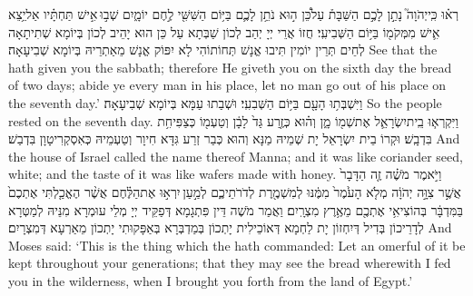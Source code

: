 {רְא֗וּ כִּֽי\maqqaf יְהֹוָה֮ נָתַ֣ן לָכֶ֣ם הַשַּׁבָּת֒ עַל\maqqaf כֵּ֠ן ה֣וּא נֹתֵ֥ן לָכֶ֛ם בַּיּ֥וֹם הַשִּׁשִּׁ֖י לֶ֣חֶם יוֹמָ֑יִם שְׁב֣וּ \legarmeh  אִ֣ישׁ תַּחְתָּ֗יו אַל\maqqaf יֵ֥צֵא אִ֛ישׁ מִמְּקֹמ֖וֹ בַּיּ֥וֹם הַשְּׁבִיעִֽי׃}
{חֲזוֹ אֲרֵי יְיָ יְהַב לְכוֹן שַׁבְּתָא עַל כֵּן הוּא יָהֵיב לְכוֹן בְּיוֹמָא שְׁתִיתָאָה לְחֵים תְּרֵין יוֹמִין תִּיבוּ אֱנָשׁ תְּחוֹתוֹהִי לָא יִפּוֹק אֱנָשׁ מֵאַתְרֵיהּ בְּיוֹמָא שְׁבִיעָאָה׃}
{See that the \lord\space hath given you the sabbath; therefore He giveth you on the sixth day the bread of two days; abide ye every man in his place, let no man go out of his place on the seventh day.’}{}
{וַיִּשְׁבְּת֥וּ הָעָ֖ם בַּיּ֥וֹם הַשְּׁבִעִֽי׃}
{וּשְׁבַתוּ עַמָּא בְּיוֹמָא שְׁבִיעָאָה׃}
{So the people rested on the seventh day.}{}
{וַיִּקְרְא֧וּ בֵֽית\maqqaf יִשְׂרָאֵ֛ל אֶת\maqqaf שְׁמ֖וֹ מָ֑ן וְה֗וּא כְּזֶ֤רַע גַּד֙ לָבָ֔ן וְטַעְמ֖וֹ כְּצַפִּיחִ֥ת בִּדְבָֽשׁ׃}
{וּקְרוֹ בֵית יִשְׂרָאֵל יָת שְׁמֵיהּ מַנָּא וְהוּא כְּבַר זְרַע גִּדָּא חִיוָר וְטַעְמֵיהּ כְּאִסְקְרִיטָוָן בִּדְבַשׁ׃}
{And the house of Israel called the name thereof Manna; and it was like coriander seed, white; and the taste of it was like wafers made with honey.}{}
{וַיֹּ֣אמֶר מֹשֶׁ֗ה זֶ֤ה הַדָּבָר֙ אֲשֶׁ֣ר צִוָּ֣ה יְהֹוָ֔ה מְלֹ֤א הָעֹ֙מֶר֙ מִמֶּ֔נּוּ לְמִשְׁמֶ֖רֶת לְדֹרֹתֵיכֶ֑ם לְמַ֣עַן \legarmeh  יִרְא֣וּ אֶת\maqqaf הַלֶּ֗חֶם אֲשֶׁ֨ר הֶאֱכַ֤לְתִּי אֶתְכֶם֙ בַּמִּדְבָּ֔ר בְּהוֹצִיאִ֥י אֶתְכֶ֖ם מֵאֶ֥רֶץ מִצְרָֽיִם׃}
{וַאֲמַר מֹשֶׁה דֵּין פִּתְגָמָא דְּפַקֵּיד יְיָ מְלֵי עוּמְרָא מִנֵּיהּ לְמַטְּרָא לְדָרֵיכוֹן בְּדִיל דְּיִחְזוֹן יָת לַחְמָא דְּאוֹכֵילִית יָתְכוֹן בְּמַדְבְּרָא בְּאַפָּקוּתִי יָתְכוֹן מֵאַרְעָא דְּמִצְרָיִם׃}
{And Moses said: ‘This is the thing which the \lord\space hath commanded: Let an omerful of it be kept throughout your generations; that they may see the bread wherewith I fed you in the wilderness, when I brought you forth from the land of Egypt.’}{}
